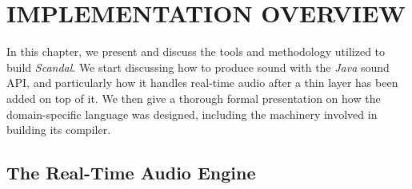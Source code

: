 
\chapter{IMPLEMENTATION OVERVIEW}

In this chapter, we present and discuss the tools and methodology utilized to build \emph{Scandal}. We start discussing how to produce sound with the \emph{Java} sound API, and particularly how it handles real-time audio after a thin layer has been added on top of it. We then give a thorough formal presentation on how the domain-specific language was designed, including the machinery involved in building its compiler.

\section{The Real-Time Audio Engine}

